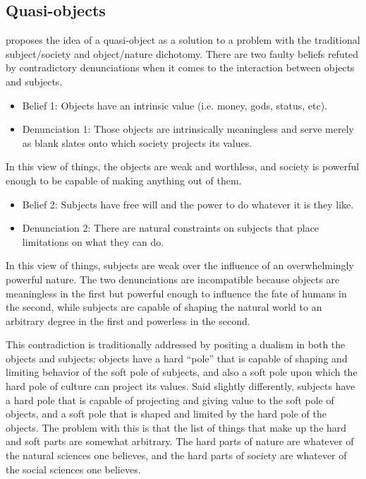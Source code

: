 \documentclass[a4paper]{article}
\begin{document}

\newpage
\begin{appendices}
\section{Quasi-objects}

\cite{latour2012we} proposes the idea of a quasi-object as a solution to a
problem with the traditional subject/society and object/nature dichotomy.
There are two faulty beliefs refuted by contradictory denunciations when it
comes to the interaction between objects and subjects.
%
\begin{itemize} \item[] Belief 1: Objects have an intrinsic value (i.e. money,
            gods, status, etc).

    \item[] Denunciation 1: Those objects are intrinsically meaningless and
        serve merely as blank slates onto which society projects its values.
\end{itemize}
%
In this view of things, the objects are weak and worthless, and society is
powerful enough to be capable of making anything out of them. 
%
\begin{itemize}
    \item[] Belief 2: Subjects have free will and the power to do whatever it
        is they like.

    \item[] Denunciation 2: There are natural constraints on subjects that
        place limitations on what they can do. 
\end{itemize}
%
In this view of things, subjects are weak over the influence of an
overwhelmingly powerful nature. The two denunciations are incompatible because
objects are meaningless in the first but powerful enough to influence the fate
of humans in the second, while subjects are capable of shaping the natural
world to an arbitrary degree in the first and powerless in the second.

This contradiction is traditionally addressed by positing a dualism in both
the objects and subjects: objects have a hard ``pole'' that is capable of
shaping and limiting behavior of the soft pole of subjects, and also a soft
pole upon which the hard pole of culture can project its values. Said slightly
differently, subjects have a hard pole that is capable of projecting and
giving value to the soft pole of objects, and a soft pole that is shaped and
limited by the hard pole of the objects. The problem with this is that the
list of things that make up the hard and soft parts are somewhat arbitrary.
The hard parts of nature are whatever of the natural sciences one believes,
and the hard parts of society are whatever of the social sciences one
believes.


\end{appendices}
\end{document}
